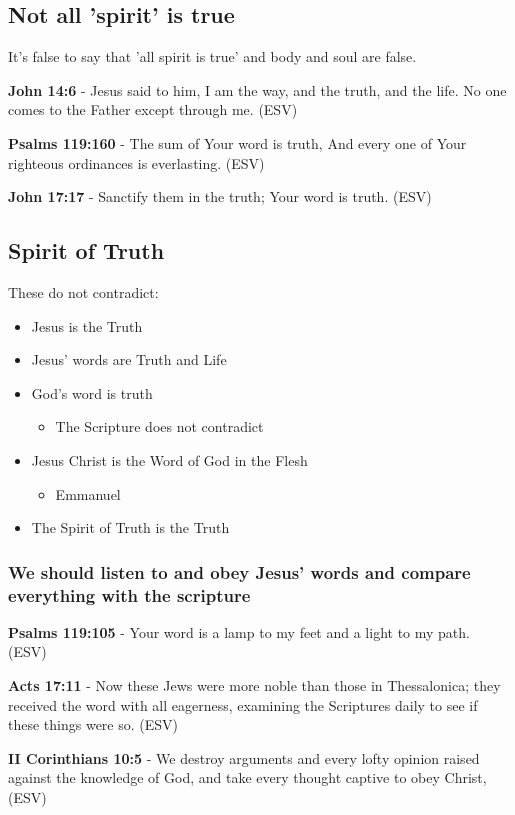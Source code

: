 \documentclass[11pt]{article}
\begin{document}
\subsection{Not all 'spirit' is true}
\label{sec:org6d18c1e}
It's false to say that 'all spirit is true' and body and soul are false.

\textbf{John 14:6} - Jesus said to him, I am the way, and the truth, and the life. No one comes to the Father except through me. (ESV)

\textbf{Psalms 119:160} - The sum of Your word is truth, And every one of Your righteous ordinances is everlasting. (ESV)

\textbf{John 17:17} - Sanctify them in the truth; Your word is truth. (ESV)

\subsection{Spirit of Truth}
\label{sec:org83afdbd}
These do not contradict:
\begin{itemize}
\item Jesus is the Truth
\item Jesus' words are Truth and Life
\item God's word is truth
\begin{itemize}
\item The Scripture does not contradict
\end{itemize}
\item Jesus Christ is the Word of God in the Flesh
\begin{itemize}
\item Emmanuel
\end{itemize}
\item The Spirit of Truth is the Truth
\end{itemize}

\subsubsection{We should listen to and obey Jesus' words and compare everything with the scripture}
\label{sec:org7785ef9}

\textbf{Psalms 119:105} - Your word is a lamp to my feet and a light to my path. (ESV)

\textbf{Acts 17:11} - Now these Jews were more noble than those in Thessalonica; they received the word with all eagerness, examining the Scriptures daily to see if these things were so. (ESV)

\textbf{II Corinthians 10:5} - We destroy arguments and every lofty opinion raised against the knowledge of God, and take every thought captive to obey Christ, (ESV)
\end{document}
